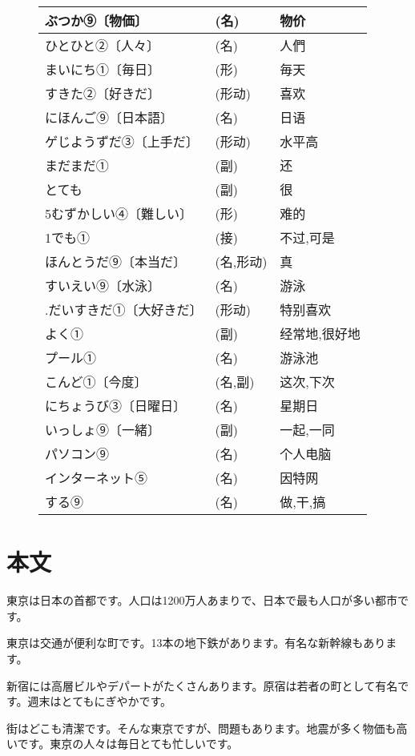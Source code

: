 \begin{figure}[htbp]
\begin{tabular}{l|l|l}
            ぶつか⑨〔物価〕&(名)&物价\\\hline
            ひとひと②〔人々〕&(名)&人們\\\hline
            まいにち①〔毎日〕&(形)&毎天\\\hline
            すきた②〔好きだ〕&(形动)&喜欢\\\hline
            にほんご⑨〔日本語〕&(名)&日语\\\hline
            ゲじようずだ③〔上手だ〕&(形动)&水平高\\\hline
            まだまだ①&(副)&还\\\hline
            とても & (副) & 很\\\hline
            5むずかしい④〔難しい〕 & (形) & 难的\\\hline
            1でも① & (接) & 不过,可是\\\hline
            ほんとうだ⑨〔本当だ〕 & (名,形动) & 真\\\hline
            すいえい⑨〔水泳〕 & (名) & 游泳\\\hline
            .だいすきだ①〔大好きだ〕 & (形动) & 特别喜欢\\\hline
            よく① & (副) & 经常地,很好地\\\hline
            プール① & (名) & 游泳池\\\hline
            こんど①〔今度〕 & (名,副) & 这次,下次\\\hline
            にちょうび③〔日曜日〕 & (名) & 星期日\\\hline
            いっしょ⑨〔一緒〕 & (副) & 一起,一同\\\hline
            パソコン⑨ & (名) & 个人电脑\\\hline
            インターネット⑤ & (名) & 因特网\\\hline
            する⑨ & (名) & 做,干,搞\\\hline
        \end{tabular}
    \end{figure}
    \section{本文}
    東京は日本の首都です。人口は1200万人あまりで、日本で最も人口が多い都市です。

    東京は交通が便利な町です。13本の地下鉄があります。有名な新幹線もあります。

    新宿には高層ビルやデパートがたくさんあります。原宿は若者の町として有名です。週末はとてもにぎやかです。

    街はどこも清潔です。そんな東京ですが、問題もあります。地震が多く物価も高いです。東京の人々は毎日とても忙しいです。
